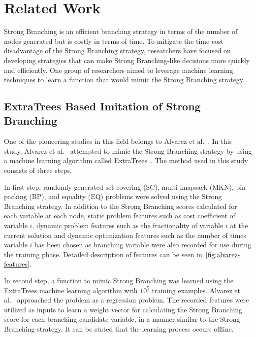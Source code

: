 \section{Related Work}\label{sec:relatedWork}

Strong Branching is an efficient branching strategy in terms of the number of nodes generated but is costly in terms of time.
To mitigate the time cost disadvantage of the Strong Branching strategy, researchers have focused on developing strategies that can make Strong Branching-like decisions more quickly and efficiently.
One group of researchers aimed to leverage machine learning techniques to learn a function that would mimic the Strong Branching strategy.


\subsection{ExtraTrees Based Imitation of Strong Branching}\label{subsec:extratrees-based-imitation-of-strong-branching}
One of the pioneering studies in this field belongs to Alvarez et al.~\cite{alvarezMachineLearningBasedApproximation2017}.
In this study, Alvarez et al.~\cite{alvarezMachineLearningBasedApproximation2017} attempted to mimic the Strong Branching strategy by using a machine learning algorithm called ExtraTrees~\cite{geurtsExtremelyRandomizedTrees2006}.
The method used in this study consists of three steps.


In first step, randomly generated set covering (SC), multi knapsack (MKN), bin packing (BP), and equality (EQ) problems were solved using the Strong Branching strategy.
In addition to the Strong Branching scores calculated for each variable at each node, static problem features such as cost coefficient of variable $i$, dynamic problem features such as the fractionality of variable $i$ at the current solution and dynamic optimization features such as the number of times variable $i$ has been chosen as branching variable were also recorded for use during the training phase.
Detailed description of features can be seen in~\ref{fig:alvarez-features}.


In second step, a function to mimic Strong Branching was learned using the ExtraTrees machine learning algorithm with $10^5$ training examples.
Alvarez et al.~\cite{alvarezMachineLearningBasedApproximation2017} approached the problem as a regression problem.
The recorded features were utilized as inputs to learn a weight vector for calculating the Strong Branching score for each branching candidate variable, in a manner similar to the Strong Branching strategy.
It can be stated that the learning process occurs offline.



